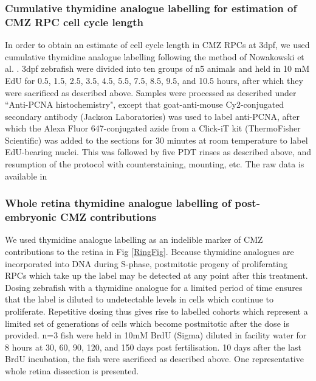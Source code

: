 \subsubsection{Cumulative thymidine analogue labelling for estimation of CMZ RPC cell cycle length}
\label{ssec:SMMEcumedu}
In order to obtain an estimate of cell cycle length in CMZ RPCs at 3dpf, we used cumulative thymidine analogue labelling following the method of Nowakowski et al. \cite{Nowakowski1989}. 3dpf zebrafish were divided into ten groups of n\=5 animals and held in 10 mM EdU for 0.5, 1.5, 2.5, 3.5, 4.5, 5.5, 7.5, 8.5, 9.5, and 10.5 hours, after which they were sacrificed as described above. Samples were processed as described under ``Anti-PCNA histochemistry", except that goat-anti-mouse Cy2-conjugated secondary antibody (Jackson Laboratories) was used to label anti-PCNA, after which the Alexa Fluor 647-conjugated azide from a Click-iT kit (ThermoFisher Scientific) was added to the sections for 30 minutes at room temperature to label EdU-bearing nuclei. This was followed by five PDT rinses as described above, and resumption of the protocol with counterstaining, mounting, etc. The raw data is available in 

\subsubsection{Whole retina thymidine analogue labelling of post-embryonic CMZ contributions}
\label{ssec:SMMEwholeretina}
We used thymidine analogue labelling as an indelible marker of CMZ contributions to the retina in Fig \ref{RingFig}. Because thymidine analogues are incorporated into DNA during S-phase, postmitotic progeny of proliferating RPCs which take up the label may be detected at any point after this treatment. Dosing zebrafish with a thymidine analogue for a limited period of time ensures that the label is diluted to undetectable levels in cells which continue to proliferate. Repetitive dosing thus gives rise to labelled cohorts which represent a limited set of generations of cells which become postmitotic after the dose is provided. n=3 fish were held in 10mM BrdU (Sigma) diluted in facility water for 8 hours at 30, 60, 90, 120, and 150 days post fertilisation. 10 days after the last BrdU incubation, the fish were sacrificed as described above. One representative whole retina dissection is presented.

